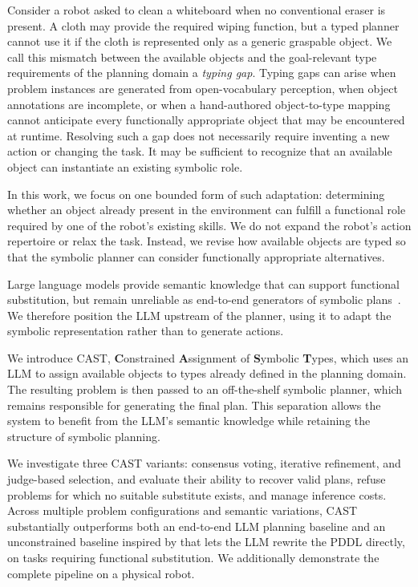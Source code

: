 Consider a robot asked to clean a whiteboard when no conventional eraser is
present. A cloth may provide the required wiping function, but a typed planner
cannot use it if the cloth is represented only as a generic graspable object.
We call this mismatch between the available objects and the goal-relevant type
requirements of the planning domain a \emph{typing gap}. Typing gaps can arise
when problem instances are generated from open-vocabulary perception, when
object annotations are incomplete, or when a hand-authored object-to-type
mapping cannot anticipate every functionally appropriate object that may be
encountered at runtime. Resolving such a gap does not necessarily require
inventing a new action or changing the task. It may be sufficient to recognize
that an available object can instantiate an existing symbolic role.

In this work, we focus on one bounded form of such adaptation: determining
whether an object already present in the environment can fulfill a functional
role required by one of the robot's existing skills. We do not expand the
robot's action repertoire or relax the task. Instead, we revise how available
objects are typed so that the symbolic planner can consider functionally
appropriate alternatives.

Large language models provide semantic knowledge that can support functional
substitution, but remain unreliable as end-to-end generators of symbolic plans~\cite{valmeekam2023planbenchextensiblebenchmarkevaluating, Stein_Fišer_Hoffmann_Koller_2025}. We therefore position the
LLM upstream of the planner, using it to adapt the symbolic representation
rather than to generate actions.

We introduce CAST, \textbf{C}onstrained \textbf{A}ssignment of \textbf{S}ymbolic \textbf{T}ypes, which uses an
LLM to assign available objects to types already defined in the planning
domain. The resulting problem is then passed to an off-the-shelf symbolic
planner, which remains responsible for generating the final plan. This
separation allows the system to benefit from the LLM's semantic knowledge while
retaining the structure of symbolic planning.

We investigate three CAST variants: consensus voting, iterative refinement,
and judge-based selection, and evaluate their ability to recover valid plans,
refuse problems for which no suitable substitute exists, and manage inference
costs. Across multiple problem configurations and semantic variations, CAST
substantially outperforms both an end-to-end LLM planning baseline and an
unconstrained baseline inspired by \citet{gragera2023exploring} that lets the LLM rewrite the PDDL directly, on tasks
requiring functional substitution. We additionally demonstrate the complete pipeline on
a physical robot.


